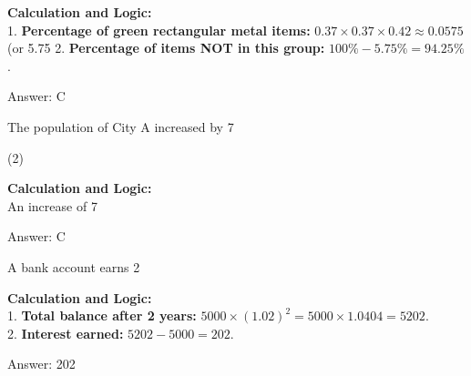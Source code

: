 \documentclass[11pt,paper=a4,answers]{exam}
\begin{document}
\begin{questions}
\begin{solution}
\textbf{Calculation and Logic:} \\
1. \textbf{Percentage of green rectangular metal items:} $0.37 \times 0.37 \times 0.42 \approx 0.0575$ (or 5.75%
2. \textbf{Percentage of items NOT in this group:} $100\% - 5.75\% = 94.25\%$.

\vspace{30pt}

Answer: \colorbox{yellow!100}{C}
\end{solution}

\vspace{60pt}

\question
The population of City A increased by 7%
\begin{tasks}(2)
\end{tasks}

\begin{solution}
\textbf{Calculation and Logic:} \\
An increase of 7%

\vspace{30pt}

Answer: \colorbox{yellow!100}{C}
\end{solution}

\vspace{60pt}

\question
A bank account earns 2%

\begin{solution}
\textbf{Calculation and Logic:} \\
1. \textbf{Total balance after 2 years:} $5000 \times (1.02)^2 = 5000 \times 1.0404 = 5202$. \\
2. \textbf{Interest earned:} $5202 - 5000 = 202$.

\vspace{30pt}

Answer: \colorbox{yellow!100}{202}
\end{solution}


\end{questions}
\end{document}
